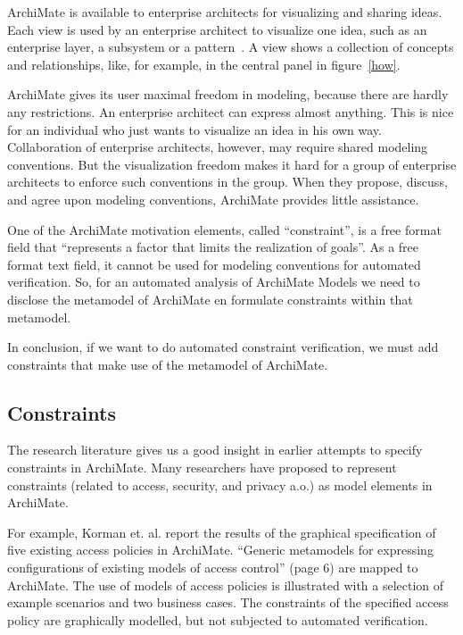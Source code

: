 \documentclass[sn-vancouver]{sn-jnl}%
\theoremstyle{thmstyleone}%
\theoremstyle{thmstyletwo}%
\theoremstyle{thmstylethree}%
\begin{document}
ArchiMate is available to enterprise architects for visualizing and sharing ideas.
Each view is used by an enterprise architect to visualize one idea, such as an enterprise layer, a subsystem or a pattern~\cite{lankhorst2010anatomy}.
A view shows a collection of concepts and relationships, like, for example, in the central panel in figure~\ref{how}.

ArchiMate gives its user maximal freedom in modeling, because there are hardly any restrictions.
An enterprise architect can express almost anything.
This is nice for an individual who just wants to visualize an idea in his own way.
Collaboration of enterprise architects, however, may require shared modeling conventions.
But the visualization freedom makes it hard for a group of enterprise architects to enforce such conventions in the group.
When they propose, discuss, and agree upon modeling conventions,
ArchiMate provides little assistance.

One of the ArchiMate motivation elements, called ``constraint'', is a free format field that ``represents a factor that limits the realization of goals''\cite{ArchiMate}.
As a free format text field, it cannot be used for modeling conventions for automated verification.
So, for an automated analysis of ArchiMate Models we need to disclose the metamodel of ArchiMate en formulate constraints within that metamodel.

In conclusion, if we want to do automated constraint verification, we must add constraints that make use of the metamodel of ArchiMate.

\subsection{Constraints}\label{Constraints}
The research literature gives us a good insight in earlier attempts to specify constraints in ArchiMate.
Many researchers have proposed to represent constraints (related to access, security, and privacy a.o.) as model elements in ArchiMate.

For example,
Korman et. al.\cite{korman2016modeling} report the results of the graphical specification of five existing access policies in ArchiMate.
``Generic metamodels for expressing configurations of existing models of access control'' (page 6) are mapped to ArchiMate.
The use of models of access policies is illustrated with a selection of example scenarios and two business cases.
The constraints of the specified access policy are graphically modelled, but not subjected to automated verification.
\end{document}
